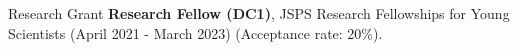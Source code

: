 \begin{rSection}{Research Grant}
{\bf Research Fellow (DC1)}, JSPS Research Fellowships for Young Scientists (April 2021 - March 2023) (Acceptance rate: 20\%).
\end{rSection}